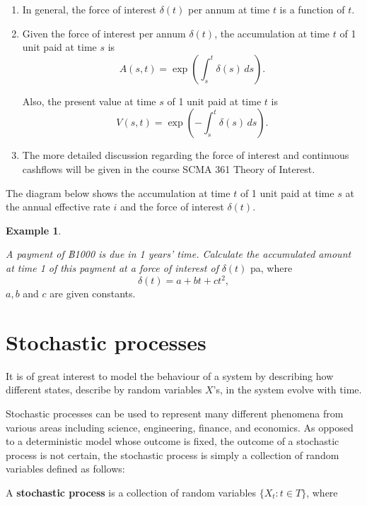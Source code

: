 \documentclass[
]{book}
\theoremstyle{definition}
\theoremstyle{definition}
\newtheorem{example}{Example}[chapter]
\theoremstyle{definition}
\theoremstyle{definition}
\theoremstyle{remark}
\begin{document}
\begin{enumerate}
\def\labelenumi{\arabic{enumi}.}
\item
  In general, the force of interest \(\delta(t)\) per annum at time \(t\)
  is a function of \(t\).
\item
  Given the force of interest per annum \(\delta(t)\), the accumulation
  at time \(t\) of 1 unit paid at time \(s\) is
  \[A(s,t) = \exp\left( \int_{s}^t \delta(s) \, ds  \right).\]

  Also, the present value at time \(s\) of 1 unit paid at time \(t\) is
  \[V(s,t) = \exp\left(- \int_{s}^t \delta(s) \, ds  \right).\]
\item
  The more detailed discussion regarding the force of interest and
  continuous cashflows will be given in the course SCMA 361 Theory of
  Interest.
\end{enumerate}

The diagram below shows the accumulation at time \(t\) of 1 unit paid at
time \(s\) at the annual effective rate \(i\) and the force of interest
\(\delta(t)\).

\begin{example}
\protect\hypertarget{exm:unlabeled-div-68}{}\label{exm:unlabeled-div-68}

\emph{A payment of ฿1000 is due in 1 years' time. Calculate the accumulated
amount at time 1 of this payment at a force of interest of} \(\delta(t)\)
pa, where \[\delta(t) = a + b t + c t^2,\] \(a,b\) and \(c\) are given
constants.

\end{example}

\hypertarget{stochastic-processes}{%
\section{Stochastic processes}\label{stochastic-processes}}

It is of great interest to model the behaviour of a system by describing
how different states, describe by random variables \(X\)'s, in the system
evolve with time.

Stochastic processes can be used to represent many different phenomena
from various areas including science, engineering, finance, and
economics. As opposed to a deterministic model whose outcome is fixed,
the outcome of a stochastic process is not certain, the stochastic
process is simply a collection of random variables defined as follows:

A \textbf{stochastic process} is a collection of random variables
\(\{ X_t : t \in T\}\), where
\end{document}
